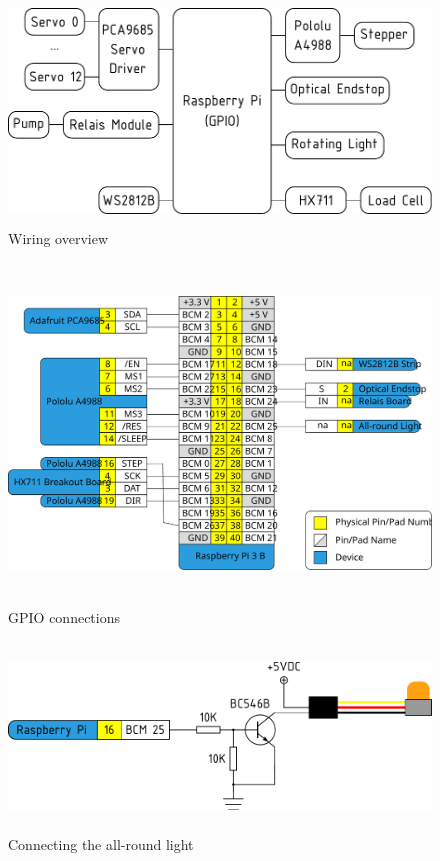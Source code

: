 \documentclass[a4paper]{scrartcl}
\begin{document}
\begin{figure}
  \centering
  \includegraphics[height=6cm]{pics/RPi_GPIO_overview.pdf}
  \caption{Wiring overview} \label{GPIO_overview}
\end{figure}

\begin{figure}
  \centering
  \includegraphics[height=9cm]{pics/Hector9000_connections.svg}
  \caption{GPIO connections} \label{GPIO_connections}
\end{figure}

\begin{figure}
  \centering
  \includegraphics[height=5cm]{pics/rundumlicht.pdf}
  \caption{Connecting the all-round light} \label{rundumlicht}
\end{figure}
\end{document}
